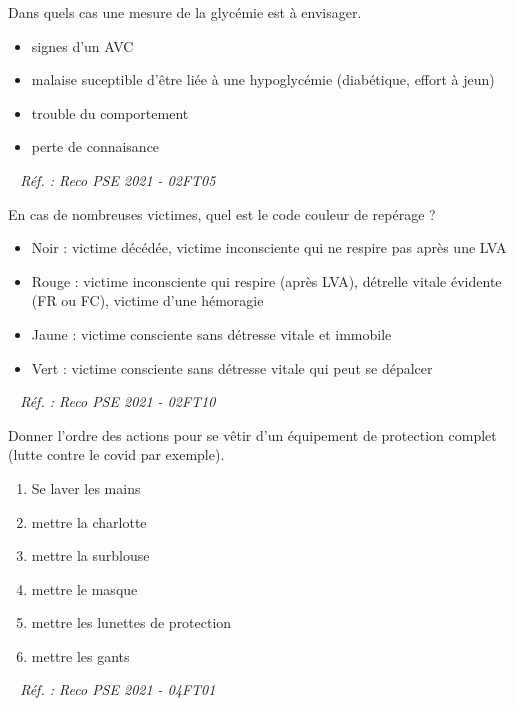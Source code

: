 \documentclass[grid,avery5371,landscape]{flashcards}
\makeatletter
\newcounter{nocarte}
\newcommand{\categ}[1]{%
  \def\@categ{#1}%
  \setcounter{nocarte}{0}%
}
\newcommand{\source}[1]{%
  \medskip
  \itshape%
   ~ \hfill Réf. : #1}
\makeatother
\begin{document}
\color[HTML]{003273}
\categ{PSE}
\begin{flashcard}[geste]{
 Dans quels cas une mesure de la glycémie est à envisager.   }
  \begin{itemize} \item signes d'un AVC \item malaise suceptible d'être liée à une hypoglycémie (diabétique, effort à jeun) \item trouble du comportement \item perte de connaisance \end{itemize}
  \source{Reco PSE 2021 - 02FT05}
\end{flashcard}


\color[HTML]{003273}
\categ{PSE}
\begin{flashcard}[bilan]{
 En cas de nombreuses victimes, quel est le code couleur de repérage ?   }
  \begin{itemize} \item Noir : victime décédée, victime inconsciente qui ne respire pas après une LVA \item Rouge : victime inconsciente qui respire (après LVA), détrelle vitale évidente (FR ou FC), victime d'une hémoragie \item Jaune : victime consciente sans détresse vitale et immobile \item Vert : victime consciente sans détresse vitale qui peut se dépalcer \end{itemize}
  \source{Reco PSE 2021 - 02FT10}
\end{flashcard}


\color[HTML]{003273}
\categ{PSE}
\begin{flashcard}[matériel]{
 Donner l'ordre des actions pour se vêtir d'un équipement de protection complet (lutte contre le covid par exemple).   }
  \begin{enumerate} \item Se laver les mains \item mettre la charlotte \item mettre la surblouse \item mettre le masque \item mettre les lunettes de protection \item mettre les gants \end{enumerate}
  \source{Reco PSE 2021 - 04FT01}
\end{flashcard}
\end{document}
